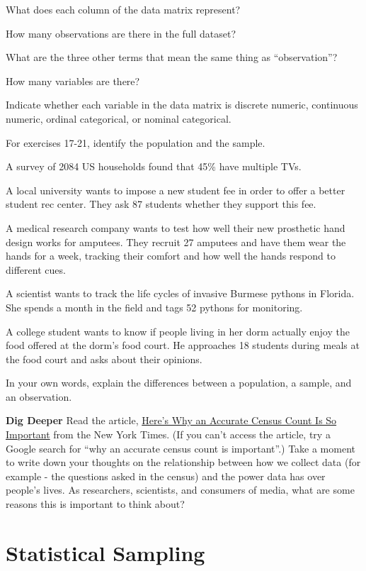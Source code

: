 \documentclass[
]{book}
\begin{document}
What does each column of the data matrix represent?

How many observations are there in the full dataset?

What are the three other terms that mean the same thing as ``observation''?

How many variables are there?

Indicate whether each variable in the data matrix is discrete numeric, continuous numeric, ordinal categorical, or nominal categorical.

For exercises 17-21, identify the population and the sample.

A survey of 2084 US households found that 45\% have multiple TVs.

A local university wants to impose a new student fee in order to offer a better student rec center. They ask 87 students whether they support this fee.

A medical research company wants to test how well their new prosthetic hand design works for amputees. They recruit 27 amputees and have them wear the hands for a week, tracking their comfort and how well the hands respond to different cues.

A scientist wants to track the life cycles of invasive Burmese pythons in Florida. She spends a month in the field and tags 52 pythons for monitoring.

A college student wants to know if people living in her dorm actually enjoy the food offered at the dorm's food court. He approaches 18 students during meals at the food court and asks about their opinions.

In your own words, explain the differences between a population, a sample, and an observation.

\textbf{Dig Deeper} Read the article, \href{https://www.nytimes.com/2018/03/27/us/politics/census-citizenship-question.html}{Here's Why an Accurate Census Count Is So Important} from the New York Times. (If you can't access the article, try a Google search for ``why an accurate census count is important''.) Take a moment to write down your thoughts on the relationship between how we collect data (for example - the questions asked in the census) and the power data has over people's lives. As researchers, scientists, and consumers of media, what are some reasons this is important to think about?

\section{Statistical Sampling}\label{statistical-sampling}
\end{document}
